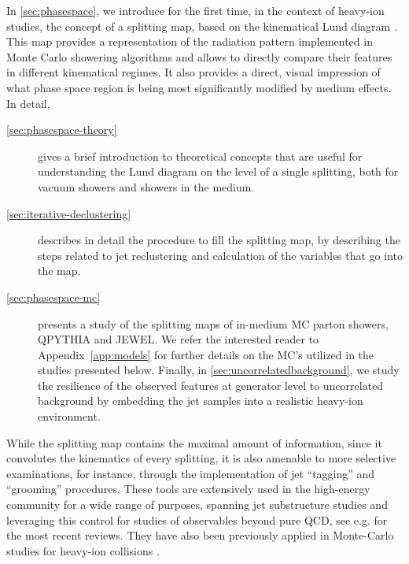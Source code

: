  In \autoref{sec:phasespace}, we introduce for the first time, in the context of heavy-ion studies, the concept of a splitting map, based on the kinematical Lund diagram \cite{Andersson:1988gp}. 
 This map provides a representation of the radiation pattern implemented in Monte Carlo showering algorithms and allows to directly compare their features in different kinematical regimes. It also provides a direct, visual impression of what phase space region is being most significantly modified by medium effects. In detail, 
\begin{description}

\item[\autoref{sec:phasespace-theory}] gives a brief introduction to theoretical concepts that are useful for understanding the Lund diagram on the level of a single splitting, both for vacuum showers and showers in the medium.

\item[\autoref{sec:iterative-declustering}] describes in detail the procedure to fill the splitting map, by describing the steps related to jet reclustering and calculation of the variables that go into the map. 

\item[\autoref{sec:phasespace-mc}] presents a study of the splitting maps of in-medium MC parton showers, QPYTHIA and JEWEL. 
We refer the interested reader to Appendix~\ref{app:models} for further details on the MC's utilized in the studies presented below. 
Finally, in \autoref{sec:uncorrelatedbackground}, we study the resilience of the observed   features at generator level to uncorrelated background by embedding the jet samples into a realistic heavy-ion environment.

\end{description}
While the splitting map contains the maximal amount of information, since it convolutes the kinematics of every splitting, it is also amenable to more selective examinations, for instance, through the implementation of jet ``tagging'' and ``grooming'' procedures. These tools are extensively used in the high-energy community \cite{Bendavid:2018nar} for a wide range of purposes, spanning jet substructure studies and leveraging this control for studies of observables beyond pure QCD, see e.g. \cite{Larkoski:2017jix,Asquith:2018igt} for the most recent reviews. They have also been previously applied in Monte-Carlo studies for heavy-ion collisions \cite{Zhang:2015trf,Apolinario:2017qay,Milhano:2017nzm}. 
